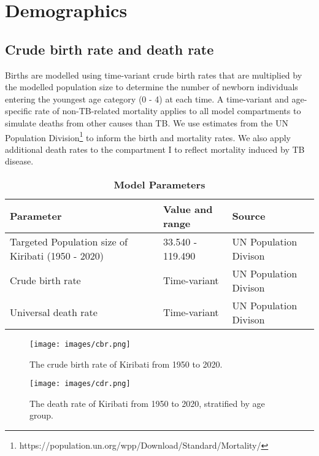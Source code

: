 

\section{Demographics}
\subsection{Crude birth rate and death rate}
Births are modelled using time-variant crude birth rates that are multiplied by the modelled population 
size to determine the number of newborn individuals entering the youngest age category (0 - 4) at each time. A time-variant 
and age-specific rate of non-TB-related mortality applies to all model compartments to simulate 
deaths from other causes than TB. We use estimates from the UN Population Division\footnote{https://population.un.org/wpp/Download/Standard/Mortality/} to inform the 
birth and mortality rates.
We also apply additional death rates to the compartment I to reflect mortality induced by TB 
disease.
\begin{table}[ht]
    \caption{\textbf{Model Parameters}}
    \label{tab:parameter}
    \begin{threeparttable}
    \begin{tabularx}{\textwidth}{ X  X  X }
        \hline
        \textbf{Parameter} & \textbf{Value and range} & \textbf{Source} \\
        \hline
        Targeted Population size of Kiribati (1950 - 2020) & 33.540 - 119.490 & UN Population Divison  \\
        \hline
        Crude birth rate  & Time-variant & UN Population Divison \\
        \hline
        Universal death rate & Time-variant & UN Population Divison \\
        \hline
	\end{tabularx}
    \end{threeparttable}
\end{table}

\begin{figure}[!ht]
    \texttt{[image: images/cbr.png]}
    \caption{The crude birth rate of Kiribati from 1950 to 2020.}
    \label{fig:cbr}
\end{figure}

\begin{figure}[!ht]
    \texttt{[image: images/cdr.png]}
    \caption{The death rate of Kiribati from 1950 to 2020, stratified by age group.}
    \label{fig:cdr}
\end{figure}

